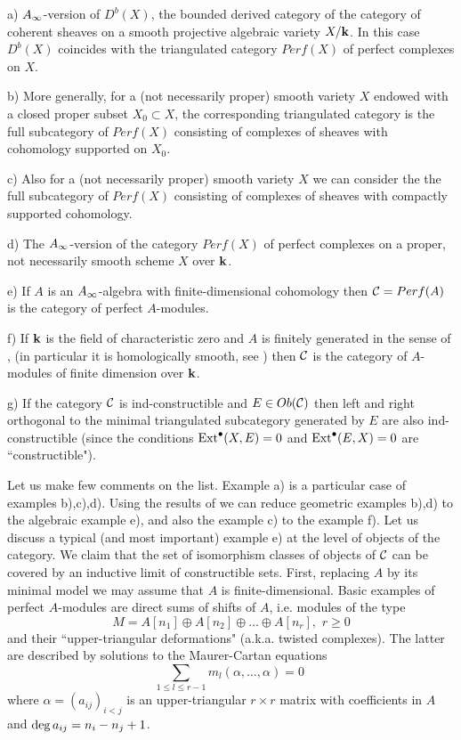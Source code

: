 \documentclass[12pt]{article}
\begin{document}
\begin{exa}
a)  $A_{\infty}$-version of $D^b(X)$, the bounded derived category of the category of coherent sheaves
on a smooth projective algebraic variety $X/{\bf k}$. In this case $D^b(X)$ coincides with the
triangulated category $Perf(X)$ of perfect complexes on $X$.

b) More generally, for a (not necessarily proper) smooth variety $X$
endowed with a closed proper  subset $X_0\subset X$,  the corresponding triangulated category is the full subcategory of $Perf(X)$ consisting
 of complexes of sheaves with cohomology supported on $X_0$.

c) Also for a (not necessarily proper) smooth variety $X$ we can consider the
 the full subcategory of $Perf(X)$ consisting
 of complexes of sheaves with compactly supported cohomology.
 
d) The $A_{\infty}$-version of the category $Perf(X)$ of perfect complexes on a proper, not necessarily smooth scheme $X$ over ${\bf k}$.


e) If $A$ is an $A_{\infty}$-algebra with finite-dimensional cohomology then ${\cal C}=Perf(A)$ is the category
of perfect $A$-modules.

f) If ${\bf k}$ is the field of characteristic zero and $A$ is finitely generated in the sense of \cite{ToVa}, (in particular it is homologically smooth, see \cite{KoSo3}) then
${\cal C}$ is the category of $A$-modules of finite dimension over ${\bf k}$.

g) If the category ${\cal C}$ is ind-constructible and $E\in Ob({\cal C})$ then left and right orthogonal
to the minimal triangulated subcategory generated by $E$ are also ind-constructible (since the conditions $\operatorname{Ext}^{\bullet}(X,E)=0$
and $\operatorname{Ext}^{\bullet}(E,X)=0$ are ``constructible").
\end{exa}

Let us make few comments on the list. Example a) is a particular case
of examples b),c),d). Using the results of \cite{BVdB}
we can reduce geometric examples b),d) to the algebraic example e),
 and also the example c) to the example f).
Let us discuss a typical (and most important) example e) at the
level of objects of the category. We claim that the set of isomorphism classes of  objects of ${\mathcal C}$ 
 can be covered by an
inductive limit of constructible sets. First, replacing $A$ by its
minimal model we may assume that $A$ is finite-dimensional. Basic
examples of perfect $A$-modules are direct sums of shifts of $A$,
i.e. modules of the type $$M=A[n_1]\oplus A[n_2]\oplus\dots\oplus
A[n_r],\,\,r\geqslant 0 $$
 and their ``upper-triangular deformations" (a.k.a. twisted
complexes). The latter are described by solutions to the Maurer-Cartan
equations $$\sum_{1\le l\le r-1}m_l(\alpha,\dots,\alpha)=0\,\,$$
 where
$\alpha=(a_{ij})_{i<j}$ is an upper-triangular $r\times r$ matrix
with coefficients in $A$ and $\operatorname{deg}a_{ij}=n_i-n_j+1$.
\end{document}
